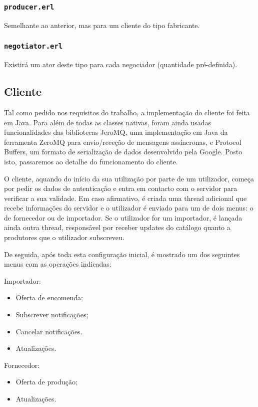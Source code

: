 \documentclass[a4paper]{report}
\begin{document}
	\subsubsection{\texttt{producer.erl}}
	Semelhante ao anterior, mas para um cliente do tipo fabricante.

	\subsubsection{\texttt{negotiator.erl}}
	Existirá um ator deste tipo para cada negociador (quantidade pré-definida).

	\subsection{Cliente}
	Tal como pedido nos requisitos do trabalho, a implementação do cliente foi feita em Java. Para além de todas as classes nativas, foram ainda usadas funcionalidades das bibliotecas JeroMQ, uma implementação em Java da ferramenta ZeroMQ para envio/receção de mensagens assíncronas, e Protocol Buffers, um formato de serialização de dados desenvolvido pela Google. Posto isto, passaremos ao detalhe do funcionamento do cliente.
	
	O cliente, aquando do início da sua utilização por parte de um utilizador, começa por pedir os dados de autenticação e entra em contacto com o servidor para verificar a sua validade. Em caso afirmativo, é criada uma thread adicional que recebe informações do servidor e o utilizador é enviado para um de dois menus: o de fornecedor ou de importador. Se o utilizador for um importador, é lançada ainda outra thread, responsável por receber updates do catálogo quanto a produtores que o utilizador subscreveu.
	
	De seguida, após toda esta configuração inicial, é mostrado um dos seguintes menus com as operações indicadas:
	
	Importador:
	\begin{itemize}
		\item Oferta de encomenda;
		\item Subscrever notificações;
		\item Cancelar notificações.
		\item Atualizações.
	\end{itemize}

	Fornecedor:
	\begin{itemize}
		\item Oferta de produção;
		\item Atualizações.
	\end{itemize}
\end{document}
